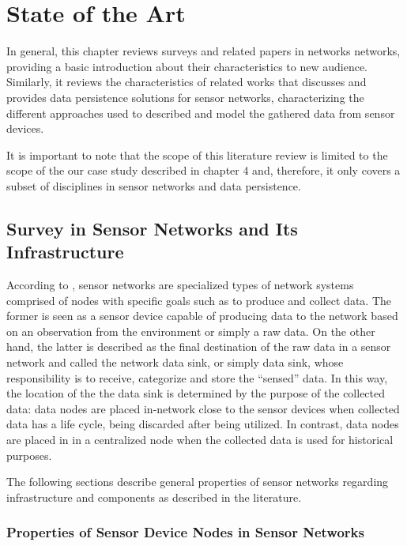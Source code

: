 

\chapter{State of the Art}

In general, this chapter reviews surveys and related papers in networks
networks, providing a basic introduction about their characteristics to new 
audience. Similarly, it reviews the characteristics of related works that
discusses and provides data persistence solutions for sensor networks, 
characterizing the different approaches used to described and model the
gathered data from sensor devices.

It is important to note that the scope of this literature review is limited to
the scope of the our case study described in chapter 4 and, therefore, it only
covers a subset of disciplines in sensor networks and data persistence.

\section{Survey in Sensor Networks and Its Infrastructure}

According to \cite{sn-intro02}, sensor networks are specialized types of
network systems comprised of nodes with specific goals such as to produce and
collect data. The former is seen as a sensor device capable of producing data
to the network based on an observation from the environment or simply a raw
data. On the other hand, the latter is described as the final destination of
the raw data in a sensor network and called the network data sink, or simply
data sink, whose responsibility is to receive, categorize and store the
``sensed'' data. In this way, the location of the the data sink is determined by
the purpose of the collected data: data nodes are placed in-network close to
the sensor devices when collected data has a life cycle, being discarded after
being utilized. In contrast, data nodes are placed in in a centralized node
when the collected data is used for historical purposes. 

The following sections describe general properties of sensor networks regarding
infrastructure and components as described in the literature.

\subsection{Properties of Sensor Device Nodes in Sensor Networks}

